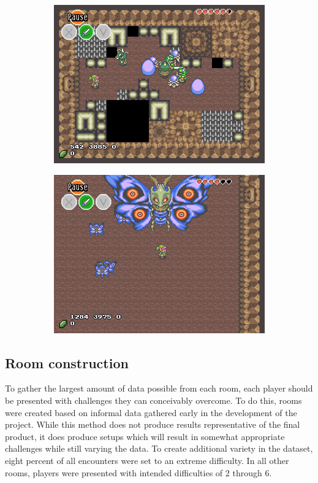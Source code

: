 \documentclass[a4paper]{article}
\begin{document}
\begin{multicols*}{2}
\begin{figure}[t]
\begin{subfigure}[b]{0.45\textwidth}
  \includegraphics[width=\textwidth]{dungeonroom}
\end{subfigure} \hfill
\begin{subfigure}[b]{0.45\textwidth}
  \includegraphics[width=\textwidth]{bossroom}
\end{subfigure} \hfill
\end{figure}

\subsection{Room construction} \label{roomconstruction}
To gather the largest amount of data possible from each room, each player should be presented with challenges they can conceivably overcome. To do this, rooms were created based on informal data gathered early in the development of the project. While this method does not produce results representative of the final product, it does produce setups which will result in somewhat appropriate challenges while still varying the data. To create additional variety in the dataset, eight percent of all encounters were set to an extreme difficulty. In all other rooms, players were presented with intended difficulties of 2 through 6.


\end{multicols*}
\end{document}
